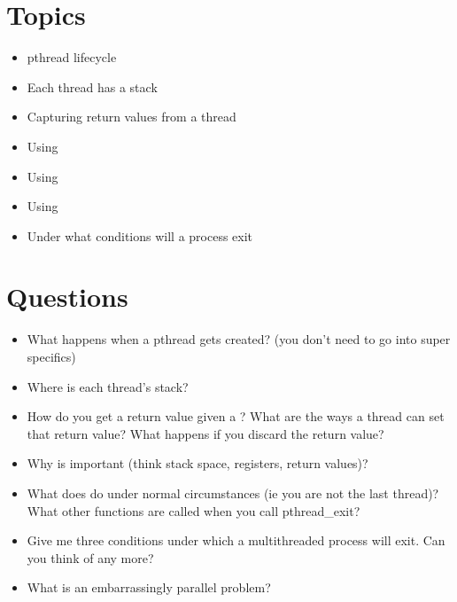 \section{Topics}\label{topics}

\begin{itemize}
\tightlist
\item
pthread lifecycle
\item
Each thread has a stack
\item
Capturing return values from a thread
\item
Using 
\item
Using 
\item
Using 
\item
Under what conditions will a process exit
\end{itemize}

\section{Questions}\label{questions}

\begin{itemize}
\tightlist
\item
What happens when a pthread gets created? (you don't need to go into super specifics)
\item
Where is each thread's stack?
\item
How do you get a return value given a ? What are the ways a thread can set that return value? What happens if you discard the return value?
\item
Why is  important (think stack space, registers, return values)?
\item
What does  do under normal circumstances (ie you are not the last thread)? What other functions are called when you call pthread\_exit?
\item
Give me three conditions under which a multithreaded process will exit. Can you think of any more?
\item
What is an embarrassingly parallel problem?
\end{itemize}



